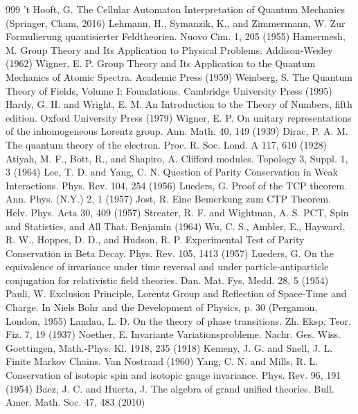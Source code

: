 \begin{thebibliography}{999}
 't Hooft, G. The Cellular Automaton Interpretation of Quantum Mechanics (Springer, Cham, 2016)
 Lehmann, H., Symanzik, K., and Zimmermann, W. Zur Formulierung quantisierter Feldtheorien. Nuovo Cim. 1, 205 (1955)
 Hamermesh, M. Group Theory and Its Application to Physical Problems. Addison-Wesley (1962)
 Wigner, E. P. Group Theory and Its Application to the Quantum Mechanics of Atomic Spectra. Academic Press (1959)
 Weinberg, S. The Quantum Theory of Fields, Volume I: Foundations. Cambridge University Press (1995)
 Hardy, G. H. and Wright, E. M. An Introduction to the Theory of Numbers, fifth edition. Oxford University Press (1979)
 Wigner, E. P. On unitary representations of the inhomogeneous Lorentz group. Ann. Math. 40, 149 (1939)
 Dirac, P. A. M. The quantum theory of the electron. Proc. R. Soc. Lond. A 117, 610 (1928)
 Atiyah, M. F., Bott, R., and Shapiro, A. Clifford modules. Topology 3, Suppl. 1, 3 (1964)
 Lee, T. D. and Yang, C. N. Question of Parity Conservation in Weak Interactions. Phys. Rev. 104, 254 (1956)
 Lueders, G. Proof of the TCP theorem. Ann. Phys. (N.Y.) 2, 1 (1957)
 Jost, R. Eine Bemerkung zum CTP Theorem. Helv. Phys. Acta 30, 409 (1957)
 Streater, R. F. and Wightman, A. S. PCT, Spin and Statistics, and All That. Benjamin (1964)
 Wu, C. S., Ambler, E., Hayward, R. W., Hoppes, D. D., and Hudson, R. P. Experimental Test of Parity Conservation in Beta Decay. Phys. Rev. 105, 1413 (1957)
 Lueders, G. On the equivalence of invariance under time reversal and under particle-antiparticle conjugation for relativistic field theories. Dan. Mat. Fys. Medd. 28, 5 (1954)
 Pauli, W. Exclusion Principle, Lorentz Group and Reflection of Space-Time and Charge. In Niels Bohr and the Development of Physics, p. 30 (Pergamon, London, 1955)
 Landau, L. D. On the theory of phase transitions. Zh. Eksp. Teor. Fiz. 7, 19 (1937)
 Noether, E. Invariante Variationsprobleme. Nachr. Ges. Wiss. Goettingen, Math.-Phys. Kl. 1918, 235 (1918)
 Kemeny, J. G. and Snell, J. L. Finite Markov Chains. Van Nostrand (1960)
 Yang, C. N. and Mills, R. L. Conservation of isotopic spin and isotopic gauge invariance. Phys. Rev. 96, 191 (1954)
 Baez, J. C. and Huerta, J. The algebra of grand unified theories. Bull. Amer. Math. Soc. 47, 483 (2010)

\end{thebibliography}
